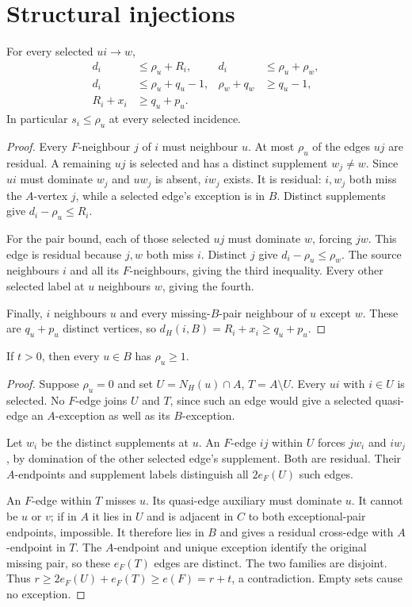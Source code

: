 \documentclass[11pt,a4paper]{article}
\begin{document}
\section{Structural injections}\label{sec:structural}
\begin{lemma}\label{lem:selected}
For every selected $ui\to w$,
\begin{align}
 d_i&\le\rho_u+R_i,&d_i&\le\rho_u+\rho_w,\label{eq:selected}\\
 d_i&\le\rho_u+q_u-1,&\rho_w+q_w&\ge q_u-1,\nonumber\\
 R_i+x_i&\ge q_u+p_u.&&\nonumber
\end{align}
In particular $s_i\le\rho_u$ at every selected incidence.
\end{lemma}
\begin{proof}
Every $F$-neighbour $j$ of $i$ must neighbour $u$. At most $\rho_u$ of the edges $uj$ are residual. A remaining $uj$ is selected and has a distinct supplement $w_j\ne w$. Since $ui$ must dominate $w_j$ and $uw_j$ is absent, $iw_j$ exists. It is residual: $i,w_j$ both miss the $A$-vertex $j$, while a selected edge's exception is in $B$. Distinct supplements give $d_i-\rho_u\le R_i$.

For the pair bound, each of those selected $uj$ must dominate $w$, forcing $jw$. This edge is residual because $j,w$ both miss $i$. Distinct $j$ give $d_i-\rho_u\le\rho_w$. The source neighbours $i$ and all its $F$-neighbours, giving the third inequality. Every other selected label at $u$ neighbours $w$, giving the fourth.

Finally, $i$ neighbours $u$ and every missing-$B$-pair neighbour of $u$ except $w$. These are $q_u+p_u$ distinct vertices, so $d_H(i,B)=R_i+x_i\ge q_u+p_u$.
\end{proof}
\begin{lemma}\label{lem:activity}
If $t>0$, then every $u\in B$ has $\rho_u\ge1$.
\end{lemma}
\begin{proof}
Suppose $\rho_u=0$ and set $U=N_H(u)\cap A$, $T=A\setminus U$. Every $ui$ with $i\in U$ is selected. No $F$-edge joins $U$ and $T$, since such an edge would give a selected quasi-edge an $A$-exception as well as its $B$-exception.

Let $w_i$ be the distinct supplements at $u$. An $F$-edge $ij$ within $U$ forces $jw_i$ and $iw_j$, by domination of the other selected edge's supplement. Both are residual. Their $A$-endpoints and supplement labels distinguish all $2e_F(U)$ such edges.

An $F$-edge within $T$ misses $u$. Its quasi-edge auxiliary must dominate $u$. It cannot be $u$ or $v$; if in $A$ it lies in $U$ and is adjacent in $C$ to both exceptional-pair endpoints, impossible. It therefore lies in $B$ and gives a residual cross-edge with $A$-endpoint in $T$. The $A$-endpoint and unique exception identify the original missing pair, so these $e_F(T)$ edges are distinct. The two families are disjoint. Thus $r\ge2e_F(U)+e_F(T)\ge e(F)=r+t$, a contradiction. Empty sets cause no exception.
\end{proof}
\end{document}
